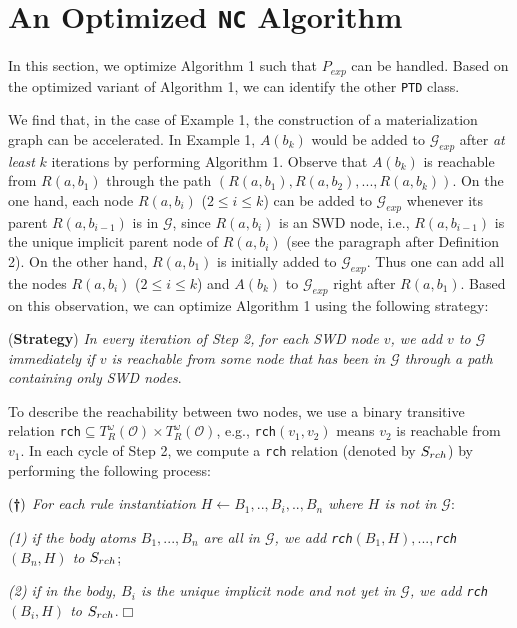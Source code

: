 \documentclass{article}
\begin{document}
\section{An Optimized \texttt{NC} Algorithm}

In this section, we optimize Algorithm 1 such that $P_{exp}$
can be handled. Based on the optimized variant of Algorithm 1, we can identify the other \texttt{PTD} class.

We find that, in the case of Example 1, the construction of a materialization graph can be accelerated.
In Example 1, $A(b_k)$ would be added to $\mathcal{G}_{exp}$ after \emph{at least} $k$ iterations by performing Algorithm 1. Observe that $A(b_k)$ is reachable from $R(a,b_1)$ through the path $(R(a,b_1),R(a,b_2),...,R(a,b_k))$. On the one hand, each node $R(a,b_i)$ ($2\leq i\leq k$) can be added to $\mathcal{G}_{exp}$ whenever its parent $R(a,b_{i-1})$ is in $\mathcal{G}$, since $R(a,b_i)$ is an SWD node, i.e., $R(a,b_{i-1})$ is the unique implicit parent node of $R(a,b_{i})$ (see the paragraph after Definition 2). On the other hand, $R(a,b_1)$ is initially added to $\mathcal{G}_{exp}$. Thus one can add all the nodes $R(a,b_i)$ ($2\leq i\leq k$) and $A(b_k)$ to $\mathcal{G}_{exp}$ right after $R(a,b_1)$.
Based on this observation, we can optimize Algorithm 1 using the following strategy:

(\textbf{Strategy}) \emph{In every iteration of Step 2, for each SWD node $v$, we add $v$ to $\mathcal{G}$ immediately if $v$ is reachable from some node that has been in $\mathcal{G}$ through a path containing only SWD nodes}.

To describe the reachability between two nodes, we use a
binary transitive relation \texttt{rch}$\subseteq T_R^{\omega}(\mathcal{O})\times T_R^{\omega}(\mathcal{O})$, e.g.,
\texttt{rch}$(v_1,v_2)$ means $v_2$ is reachable from $v_1$. In each cycle of Step 2, we compute a \texttt{rch}
relation (denoted by $S_{\tiny rch}$) by performing the following process:

$(\textbf{\dag})$ \emph{For each rule instantiation $H\leftarrow B_1,..,B_i,..,B_n$ where $H$ is not in $\mathcal{G}$}:

\emph{(1) if the body atoms $B_1,...,B_n$ are all in $\mathcal{G}$, we add \texttt{rch}$(B_1,H),...,$\texttt{rch}$(B_n,H)$ to $S_{\tiny rch}$};

\emph{(2) if in the body, $B_i$ is the unique implicit node and not yet in $\mathcal{G}$, we add \texttt{rch}$(B_i,H)$ to $S_{\tiny rch}$}.\hfill$\Box$
\end{document}
